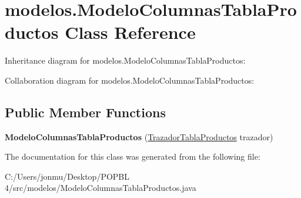 \hypertarget{classmodelos_1_1_modelo_columnas_tabla_productos}{}\section{modelos.\+Modelo\+Columnas\+Tabla\+Productos Class Reference}
\label{classmodelos_1_1_modelo_columnas_tabla_productos}


Inheritance diagram for modelos.\+Modelo\+Columnas\+Tabla\+Productos\+:


Collaboration diagram for modelos.\+Modelo\+Columnas\+Tabla\+Productos\+:
\subsection*{Public Member Functions}
\begin{DoxyCompactItemize}
\item 
\mbox{\label{classmodelos_1_1_modelo_columnas_tabla_productos_a7807b42a8c5c5630006122c92b2d9a84}} 
{\bfseries Modelo\+Columnas\+Tabla\+Productos} (\mbox{\hyperlink{classrenderer_1_1_trazador_tabla_productos}{Trazador\+Tabla\+Productos}} trazador)
\end{DoxyCompactItemize}


The documentation for this class was generated from the following file\+:\begin{DoxyCompactItemize}
\item 
C\+:/\+Users/jonmu/\+Desktop/\+P\+O\+P\+B\+L 4/src/modelos/Modelo\+Columnas\+Tabla\+Productos.\+java\end{DoxyCompactItemize}
